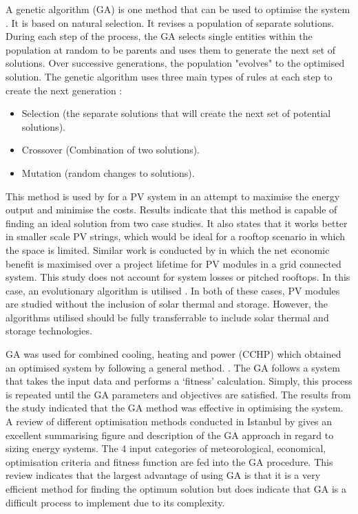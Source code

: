 A genetic algorithm (GA) is one method that can be used to optimise the 
system \cite{Goldberg}. It is based on natural selection. It revises a population of 
separate solutions. During each step of the process, the GA selects single 
entities within the population at random to be parents and uses them to 
generate the next set of solutions. Over successive generations, the 
population "evolves" to the optimised solution. The genetic algorithm uses 
three main types of rules at each step to create the next generation \cite{matlab}:
\begin{itemize}
  \item Selection (the separate solutions that will create the next set of potential solutions).
  \item Crossover (Combination of two solutions).
  \item Mutation (random changes to solutions).
\end{itemize}

This method is used by \cite{FREITAS2015562} for a PV system in an attempt to 
maximise the energy output and minimise the costs. Results indicate that this 
method is capable of finding an ideal solution from two case studies. It 
also states that it works better in smaller scale PV strings, which would be 
ideal for a rooftop scenario in which the space is limited. Similar work is 
conducted by \cite{kornelakis} in which the net economic benefit is maximised over a 
project lifetime for PV modules in a grid connected system. This study does 
not account for system losses or pitched rooftops. In this case, an 
evolutionary algorithm is utilised \cite{Back}. In both of these cases, PV modules 
are studied without the inclusion of solar thermal and storage. However, 
the algorithms utilised should be fully transferrable to include solar 
thermal and storage technologies. 

GA was used for combined cooling, heating and power (CCHP) which obtained an 
optimised system by following a general method. \cite{WANG20101325}. The GA follows a system 
that takes the input data and performs a ‘fitness’ calculation. Simply, this 
process is repeated until the GA parameters and objectives are satisfied. 
The results from the study indicated that the GA method was effective in 
optimising the system. A review of different optimisation methods conducted 
in Istanbul by \cite{ERDINC20121412} gives an excellent summarising figure and description of the GA approach in regard to sizing energy systems. The 4 input categories of meteorological, economical, optimisation criteria and fitness function are fed into the GA procedure. This review indicates that the largest advantage of using GA is that it is a very efficient method for finding the optimum solution but does indicate that GA is a difficult process to implement due to its complexity.


